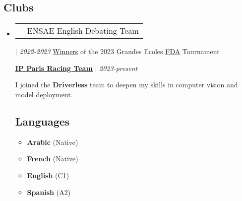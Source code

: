 \documentclass[letterpaper,11pt]{article}
\makeatletter
\newcommand{\resumeItem}[1]{
  \item\small{
    {#1 \vspace{-2pt}}
  }
}
\newcommand{\resumeProjectHeading}[2]{
    \item
    \begin{tabular*}{0.97\textwidth}{l@{\extracolsep{\fill}}r}
      \small#1 & #2 \\
    \end{tabular*}\vspace{-7pt}
}
\newcommand{\resumeSubHeadingListStart}{\begin{itemize}[leftmargin=0.15in, label={}]}
\newcommand{\resumeSubHeadingListEnd}{\end{itemize}}
\newcommand{\resumeItemListStart}{\begin{itemize}}
\newcommand{\resumeItemListEnd}{\end{itemize}\vspace{-5pt}}
\makeatother
\begin{document}
\vspace{-10pt}
    \begin{multicols}{2}
    \section*{\faSlideshare\hspace{2pt}Clubs}
    \resumeSubHeadingListStart%
        
        \resumeProjectHeading%

        \textbf{ENSAE English Debating Team}  $|$ \footnotesize\emph{2022-2023}
        \newline
        \href{https://www.linkedin.com/feed/update/urn:li:activity:7050135401461669888?updateEntityUrn=urn%3Ali%3Afs_feedUpdate%3A%28V2%2Curn%3Ali%3Aactivity%3A7050135401461669888%29}{\underline{Winners}} {of the 2023 Grandes Ecoles \href{https://www.frenchdebatingassociation.fr/#fda}{\underline{FDA}} Tournament }
        \vspace{6pt}
        
        {\textbf{\href{https://www.linkedin.com/company/ip-paris-racing-team/?originalSubdomain=fr}{\underline{IP Paris Racing Team}}} $|$ \footnotesize\emph{2023-present}}
        
        {\small{I joined the \textbf{Driverless} team to deepen my skills in computer vision and model deployment. }}
        
    \columnbreak%
    

    
    \vspace{-10pt}
    \section*{\faLanguage\hspace{2pt}Languages}
    \resumeItemListStart{}
    \resumeItem{\textbf {Arabic} (Native)}
    \resumeItem{\textbf {French} (Native)}
    \resumeItem{\textbf {English} (C1)}
    \resumeItem{\textbf {Spanish} (A2)}
    \resumeItemListEnd{}
        
          
    \resumeSubHeadingListEnd%
    \end{multicols}
\end{document}
